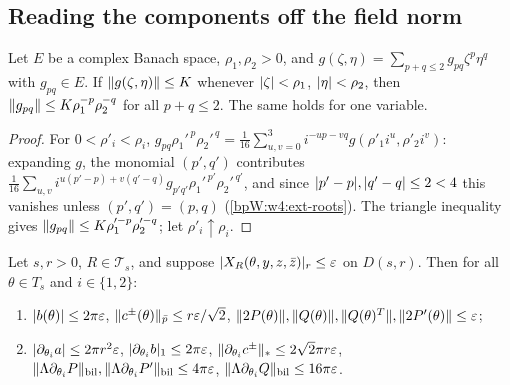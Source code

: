 
\subsection{Reading the components off the field norm}\label{bpW:w4:extract-sec}

\begin{lemma}\label{bpW:w4:extract}
Let $E$ be a complex Banach space, $\rho_1,\rho_2>0$, and $g(\zeta,\eta)=\sum_{p+q\le2}g_{pq}\zeta^p\eta^q$ with
$g_{pq}\in E$. If $\lVert g(\zeta,\eta)\rVert\le K$ whenever $\lvert \zeta\rvert<\rho_1$, $\lvert \eta\rvert<\rho_2$, then
$\lVert g_{pq}\rVert\le K\rho_1^{-p}\rho_2^{-q}$ for all $p+q\le2$. The same holds for one variable.
\end{lemma}

\begin{proof}
For $0<\rho'_i<\rho_i$,
$g_{pq}\rho_1'^{\,p}\rho_2'^{\,q}=\frac1{16}\sum_{u,v=0}^3i^{-up-vq}g(\rho'_1i^u,\rho'_2i^v)$: expanding $g$, the
monomial $(p',q')$ contributes $\frac1{16}\sum_{u,v}i^{u(p'-p)+v(q'-q)}g_{p'q'}\rho_1'^{\,p'}\rho_2'^{\,q'}$, and since
$\lvert p'-p\rvert,\lvert q'-q\rvert\le2<4$ this vanishes unless $(p',q')=(p,q)$ (\ref{bpW:w4:ext-roots}). The triangle inequality
gives $\lVert g_{pq}\rVert\le K\rho_1'^{-p}\rho_2'^{-q}$; let $\rho'_i\uparrow\rho_i$.
\end{proof}

\begin{lemma}\label{bpW:w4:components}
Let $s,r>0$, $R\in\mathcal T_s$, and suppose $\lvert X_R(\theta,y,z,\bar z)\rvert_r\le\varepsilon$ on $D(s,r)$. Then for all
$\theta\in T_s$ and $i\in\{1,2\}$:
\begin{enumerate}[label=(\roman*)]
\item $\lvert b(\theta)\rvert\le2\pi\varepsilon$, $\lVert c^\pm(\theta)\rVert_{\bar p}\le r\varepsilon/\sqrt2$,
  $\lVert 2P(\theta)\rVert,\lVert Q(\theta)\rVert,\lVert Q(\theta)^T\rVert,\lVert 2P'(\theta)\rVert\le\varepsilon$;
\item $\lvert \partial_{\theta_i}a\rvert\le2\pi r^2\varepsilon$, $\lvert \partial_{\theta_i}b\rvert_1\le2\pi\varepsilon$,
  $\lVert \partial_{\theta_i}c^\pm\rVert_*\le2\sqrt2\pi r\varepsilon$, $\lVert \Lambda\partial_{\theta_i}P\rVert_{\rm bil},
  \lVert \Lambda\partial_{\theta_i}P'\rVert_{\rm bil}\le4\pi\varepsilon$, $\lVert \Lambda\partial_{\theta_i}Q\rVert_{\rm bil}\le16\pi\varepsilon$.
\end{enumerate}
\end{lemma}

